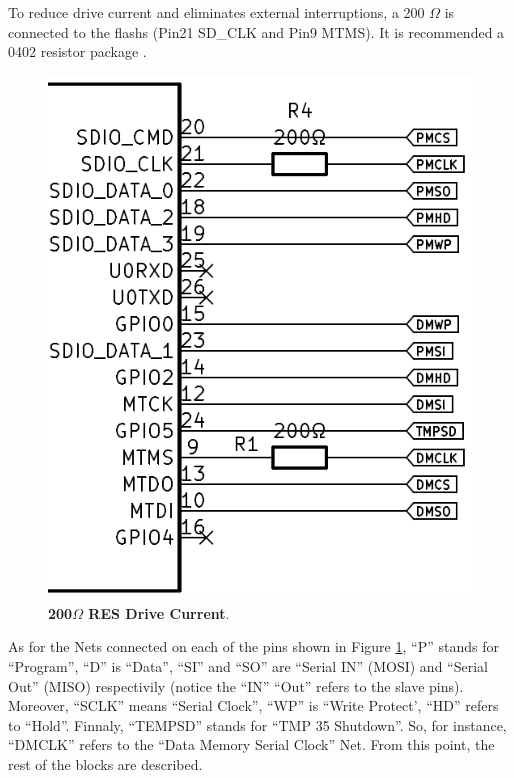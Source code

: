 To reduce drive current and eliminates external interruptions, a 200 $\Omega$ is connected to the flashs 
(Pin21 SD\_CLK and Pin9 MTMS). It is recommended a 0402 resistor package \cite{ESP8266HGL}.

\begin{figure}[H]
    \centering
    \includegraphics[scale = 0.5]{imagens/DriveCurrentSCLKRES.png}
    \caption{\textbf{200$\Omega$ RES Drive Current}.}
    \label{02fig:DriveCurrentSCLKRES}
\end{figure}




As for the Nets connected on each of the pins shown in Figure \ref{02fig:DriveCurrentSCLKRES},
``P'' stands for ``Program'', ``D'' is ``Data'', ``SI'' and ``SO'' are ``Serial IN'' (MOSI) and
``Serial Out'' (MISO) respectivily (notice the ``IN'' ``Out'' refers to the slave pins). Moreover,
``SCLK'' means ``Serial Clock'', ``WP'' is ``Write Protect', ``HD'' refers to ``Hold''.
Finnaly, ``TEMPSD'' stands for ``TMP 35 Shutdown''. So, for instance, ``DMCLK''
refers to the ``Data Memory Serial Clock'' Net. From this point, the rest of the 
blocks are described.






